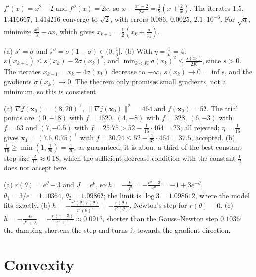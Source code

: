 \documentclass[11pt]{article}
\newcommand{\norm}[1]{\lVert #1 \rVert}
\begin{document}
\begin{description}[leftmargin=0pt, itemsep=0.3em]
    \item[\ref{pr:babylonian}.] $f'(x) = x^2 - 2$ and $f''(x) = 2x$, so $x - \frac{x^2 - 2}{2x} = \frac{1}{2}(x + \frac{2}{x})$. The iterates $1.5$, $1.416667$, $1.414216$ converge to $\sqrt{2}$, with errors $0.086$, $0.0025$, $2.1 \cdot 10^{-6}$. For $\sqrt{a}$, minimize $\frac{x^3}{3} - ax$, which gives $x_{k+1} = \frac{1}{2}(x_k + \frac{a}{x_k})$.
    \item[\ref{pr:smooth-descent}.] (a) $s' = \sigma$ and $s'' = \sigma(1 - \sigma) \in (0, \frac{1}{4}]$. (b) With $\eta = \frac{1}{L} = 4$: $s(x_{k+1}) \leq s(x_k) - 2\sigma(x_k)^2$, and $\min_{k < K}\sigma(x_k)^2 \leq \frac{s(x_0)}{2K}$, since $s > 0$. The iterates $x_{k+1} = x_k - 4\sigma(x_k)$ decrease to $-\infty$, $s(x_k) \to 0 = \inf s$, and the gradients $\sigma(x_k) \to 0$. The theorem only promises small gradients, not a minimum, so this is consistent.
    \item[\ref{pr:backtracking}.] (a) $\nabla f(\mathbf{x}_0) = (8, 20)^\top$, $\norm{\nabla f(\mathbf{x}_0)}^2 = 464$ and $f(\mathbf{x}_0) = 52$. The trial points are $(0, -18)$ with $f = 1620$, $(4, -8)$ with $f = 328$, $(6, -3)$ with $f = 63$ and $(7, -0.5)$ with $f = 25.75 > 52 - \frac{1}{16} \cdot 464 = 23$, all rejected; $\eta = \frac{1}{16}$ gives $\mathbf{x}_1 = (7.5, 0.75)^\top$ with $f = 30.94 \leq 52 - \frac{1}{32} \cdot 464 = 37.5$, accepted. (b) $\frac{1}{16} \geq \min(1, \frac{1}{20}) = \frac{1}{20}$, as guaranteed; it is about a third of the best constant step size $\frac{2}{11} \approx 0.18$, which the sufficient decrease condition with the constant $\frac{1}{2}$ does not accept here.
\item[\ref{pr:gauss-newton}.] (a) $r(\theta) = e^\theta - 3$ and $J = e^\theta$, so $h = -\frac{Jr}{J^2} = -\frac{e^\theta - 3}{e^\theta} = -1 + 3e^{-\theta}$. $\theta_1 = 3/e = 1.10364$, $\theta_2 = 1.09862$; the limit is $\log 3 = 1.098612$, where the model fits exactly. (b) $h = -\frac{r'(\theta)r(\theta)}{r'(\theta)^2} = -\frac{r(\theta)}{r'(\theta)}$, Newton's step for $r(\theta) = 0$. (c) $h = -\frac{Jr}{J^2 + \lambda} = -\frac{e(e - 3)}{e^2 + 1} \approx 0.0913$, shorter than the Gauss--Newton step $0.1036$: the damping shortens the step and turns it towards the gradient direction.
\end{description}

\section*{Convexity}
\end{document}
